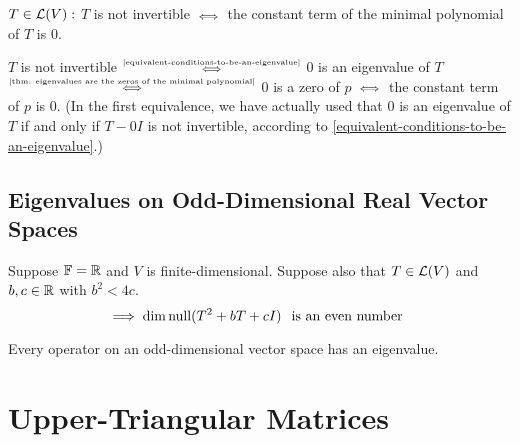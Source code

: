 \begin{thm} 
  $T \in \mathcal{L} (V):$ $T$ is not invertible $\mathsmaller{\iff}$ the constant term of the minimal polynomial of $T$ is $0$.
\end{thm}
\begin{prf}
  $T$ is not invertible $\mathsmaller{\overset{\text{\ref{equivalent-conditions-to-be-an-eigenvalue}}}{\iff}}$ $0$ is an eigenvalue of $T$ $\mathsmaller{\overset{\text{\ref{thm: eigenvalues are the zeros of the minimal polynomial}}}{\iff}}$ $0$ is a zero of $p$ $\mathsmaller{\iff}$ the constant term of $p$ is $0$.
  (In the first equivalence, we have actually used that $0$ is an eigenvalue of $T$ if and only if $T-0I$ is not invertible, according to \ref{equivalent-conditions-to-be-an-eigenvalue}.)
  
\end{prf}

\subsection{Eigenvalues on Odd-Dimensional Real Vector Spaces}
\begin{thm}
  Suppose $\mathbb{F} = \mathbb{R}$ and $V$ is finite-dimensional. Suppose also that $T \in \mathcal{L} (V)$ and $b,c \in \mathbb{R}$ with $b^2 < 4c$. 
  \begin{equation}
    \implies \dim \operatorname{null} (T^2 +bT +cI) \;\;\, \text{is an even number}\;\;
  \end{equation}
\end{thm}

\begin{thm}
  Every operator on an odd-dimensional vector space has an eigenvalue.
\end{thm}

\section{Upper-Triangular Matrices}

